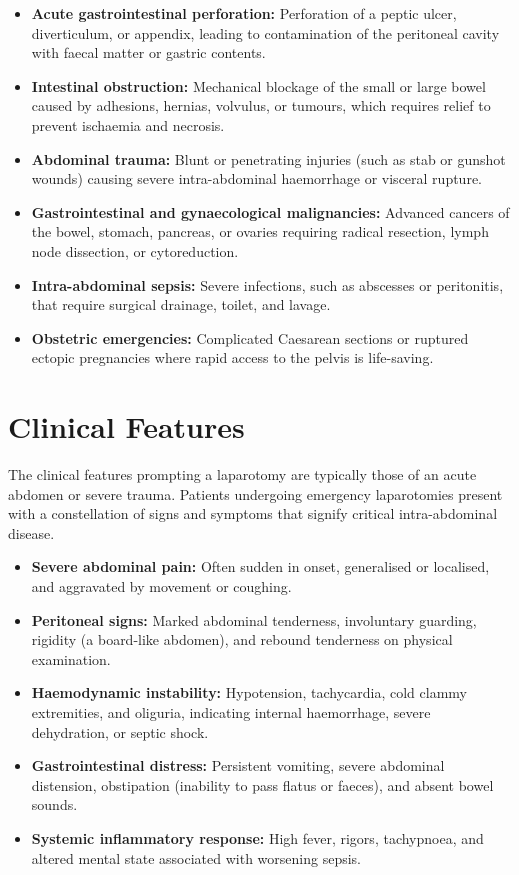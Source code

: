 \begin{itemize}
    \item \textbf{Acute gastrointestinal perforation:} Perforation of a peptic ulcer, diverticulum, or appendix, leading to contamination of the peritoneal cavity with faecal matter or gastric contents.
    \item \textbf{Intestinal obstruction:} Mechanical blockage of the small or large bowel caused by adhesions, hernias, volvulus, or tumours, which requires relief to prevent ischaemia and necrosis.
    \item \textbf{Abdominal trauma:} Blunt or penetrating injuries (such as stab or gunshot wounds) causing severe intra-abdominal haemorrhage or visceral rupture.
    \item \textbf{Gastrointestinal and gynaecological malignancies:} Advanced cancers of the bowel, stomach, pancreas, or ovaries requiring radical resection, lymph node dissection, or cytoreduction.
    \item \textbf{Intra-abdominal sepsis:} Severe infections, such as abscesses or peritonitis, that require surgical drainage, toilet, and lavage.
    \item \textbf{Obstetric emergencies:} Complicated Caesarean sections or ruptured ectopic pregnancies where rapid access to the pelvis is life-saving.
\end{itemize}

\section*{Clinical Features}
The clinical features prompting a laparotomy are typically those of an acute abdomen or severe trauma. Patients undergoing emergency laparotomies present with a constellation of signs and symptoms that signify critical intra-abdominal disease.

\begin{itemize}
    \item \textbf{Severe abdominal pain:} Often sudden in onset, generalised or localised, and aggravated by movement or coughing.
    \item \textbf{Peritoneal signs:} Marked abdominal tenderness, involuntary guarding, rigidity (a board-like abdomen), and rebound tenderness on physical examination.
    \item \textbf{Haemodynamic instability:} Hypotension, tachycardia, cold clammy extremities, and oliguria, indicating internal haemorrhage, severe dehydration, or septic shock.
    \item \textbf{Gastrointestinal distress:} Persistent vomiting, severe abdominal distension, obstipation (inability to pass flatus or faeces), and absent bowel sounds.
    \item \textbf{Systemic inflammatory response:} High fever, rigors, tachypnoea, and altered mental state associated with worsening sepsis.
\end{itemize}

